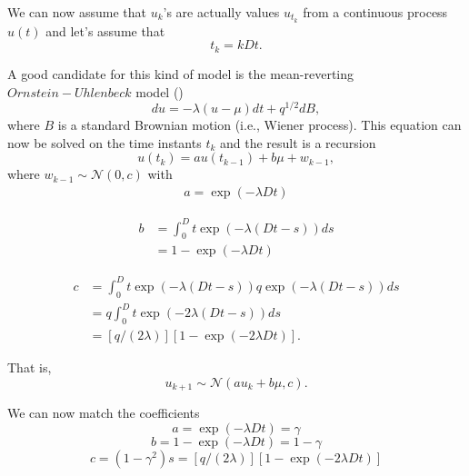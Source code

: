 We can now assume that $u_k$'s are actually values $u_{t_k}$ from a continuous process $u(t)$ and let's assume that 
\begin{equation}
t_k = kDt.
\end{equation}

A good candidate for this kind of model is the mean-reverting $Ornstein-Uhlenbeck$ model 
(\cite{Ornstein_Uhlenbeck:1930})
\begin{equation}
du = -\lambda \left(u - \mu\right) dt + q^{1/2} dB,
\end{equation}
where $B$ is a standard Brownian motion (i.e., Wiener process). This equation can now be solved on the time instants $t_k$ and the result is a recursion
\begin{equation}
u(t_k) = a u(t_{k-1}) + b \mu + w_{k-1},
\end{equation}
where $w_{k-1} \sim \mathcal{N}(0,c)$ with
\begin{equation*} \label{eq:a}
\begin{split}
a = \exp(-\lambda Dt)
\end{split}
\end{equation*}

\begin{equation*} \label{eq:b}
\begin{split}
b &= \int_0^Dt \exp(-\lambda (Dt-s)) ds\\
  &= 1 - \exp(-\lambda Dt)
\end{split}
\end{equation*}

\begin{equation*} \label{eq:c}
\begin{split} 
c &= \int_0^Dt \exp(-\lambda (Dt-s)) q \exp(-\lambda (Dt-s)) ds \\
  &= q \int_0^Dt \exp(-2 \lambda (Dt-s)) ds\\
  &= [q / (2 \lambda)] [1 - \exp(-2 \lambda Dt)].
\end{split}
\end{equation*}

That is,
\begin{equation}
u_{k+1} \sim \mathcal{N}\left(a u_k + b \mu, c\right).
\end{equation}

We can now match the coefficients
\begin{equation} \label{eq:a}
a = \exp(-\lambda Dt) = \gamma
\end{equation}
\begin{equation} \label{eq:b}
b = 1 - \exp(-\lambda Dt) = 1 - \gamma
\end{equation}
\begin{equation} \label{eq:c}
c = (1 - \gamma^2) s = [q / (2 \lambda)] [1 - \exp(-2 \lambda Dt)]
\end{equation}

